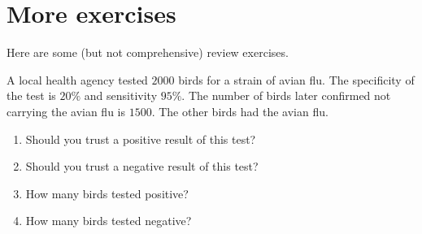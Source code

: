 \documentclass[../main.tex]{subfiles}
\begin{document}
 \section{More exercises}

Here are some (but not comprehensive) review exercises.  

%
%
%
%
%
%
%
%
%
%

\begin{exercise}
  A local health agency tested \(2000\) birds for a strain of avian flu.  The specificity of the test is \(20\%\) and sensitivity \(95\%\).  The number of birds later confirmed not carrying the avian flu is \(1500\). The other birds had the avian flu. 

  \begin{enumerate}[wide]
    \item Should you trust a positive result of this test?

    \item Should you trust a negative result of this test?

    \item How many birds tested positive?

    \item How many birds tested negative?

      \blanks*
  \end{enumerate}
\end{exercise}
\clearpage
\end{document}

